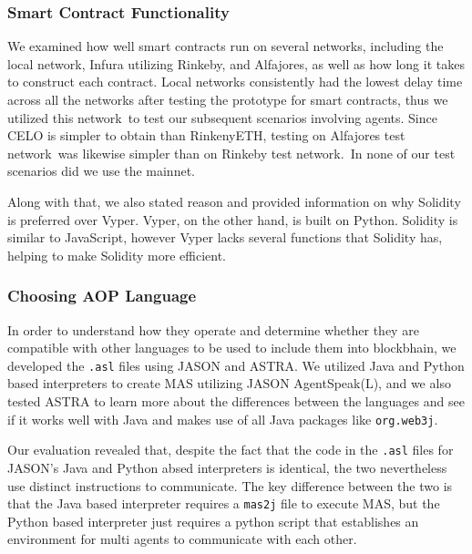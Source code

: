 \subsubsection{Smart Contract Functionality}
  
  We examined how well smart contracts run on several networks, including the local network, Infura utilizing Rinkeby, and Alfajores, as well as how long it takes to construct each contract. Local networks consistently had the lowest delay time across all the networks after testing the prototype for smart contracts, thus we utilized this network to test our subsequent scenarios involving agents. Since CELO is simpler to obtain than RinkenyETH, testing on Alfajores test network was likewise simpler than on Rinkeby test network. In none of our test scenarios did we use the mainnet.
  
  \vspace{.5cm}
  
  Along with that, we also stated reason and provided information on why Solidity is preferred over Vyper. Vyper, on the other hand, is built on Python. Solidity is similar to JavaScript, however Vyper lacks several functions that Solidity has, helping to make Solidity more efficient.

\subsubsection{Choosing \ac{AOP} Language}

  In order to understand how they operate and determine whether they are compatible with other languages to be used to include them into blockbhain, we developed the \texttt{.asl} files using JASON and \ac{ASTRA}. We utilized Java and Python based interpreters to create \ac{MAS} utilizing JASON AgentSpeak(L), and we also tested \ac{ASTRA} to learn more about the differences between the languages and see if it works well with Java and makes use of all Java packages like \texttt{org.web3j}. 

  \vspace{.5cm}
  
  Our evaluation revealed that, despite the fact that the code in the \texttt{.asl} files for JASON's Java and Python absed interpreters is identical, the two nevertheless use distinct instructions to communicate. The key difference between the two is that the Java based interpreter requires a \texttt{mas2j} file to execute \ac{MAS}, but the Python based interpreter just requires a python script that establishes an environment for multi agents to communicate with each other.

